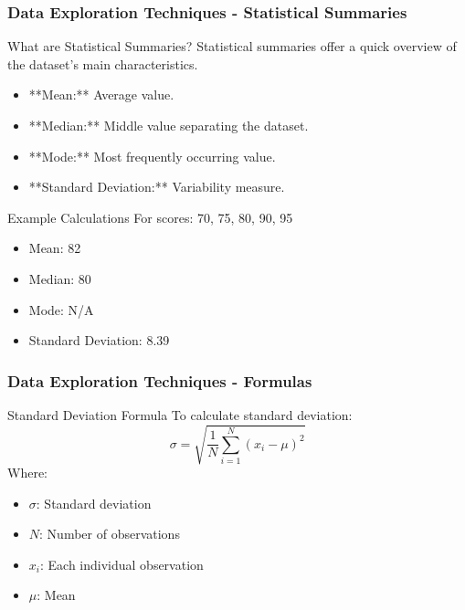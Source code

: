 \documentclass[aspectratio=169]{beamer}
\begin{document}
\begin{frame}[fragile]
    \frametitle{Data Exploration Techniques - Statistical Summaries}
    \begin{block}{What are Statistical Summaries?}
        Statistical summaries offer a quick overview of the dataset's main characteristics.
    \end{block}
    \begin{itemize}
        \item **Mean:** Average value.
        \item **Median:** Middle value separating the dataset.
        \item **Mode:** Most frequently occurring value.
        \item **Standard Deviation:** Variability measure.
    \end{itemize}
    \begin{block}{Example Calculations}
        For scores: 70, 75, 80, 90, 95
        \begin{itemize}
            \item Mean: 82
            \item Median: 80
            \item Mode: N/A
            \item Standard Deviation: 8.39
        \end{itemize}
    \end{block}
\end{frame}

\begin{frame}[fragile]
    \frametitle{Data Exploration Techniques - Formulas}
    \begin{block}{Standard Deviation Formula}
        To calculate standard deviation:
        \begin{equation}
            \sigma = \sqrt{\frac{1}{N} \sum_{i=1}^{N} (x_i - \mu)^2}
        \end{equation}
        Where:
        \begin{itemize}
            \item $\sigma$: Standard deviation
            \item $N$: Number of observations
            \item $x_i$: Each individual observation
            \item $\mu$: Mean
        \end{itemize}
    \end{block}
\end{frame}
\end{document}

